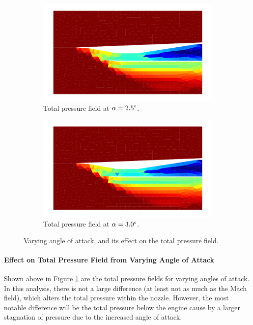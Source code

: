 \begin{figure}[h]
    \begin{subfigure}[h]{0.48\linewidth}
        \centering
        \includegraphics[width=\linewidth]{rep/q5/pt_a25.pdf}
        \caption{Total pressure field at $\alpha=2.5\degree$.}
    \end{subfigure}
    \begin{subfigure}[h]{0.48\linewidth}
        \centering
        \includegraphics[width=\linewidth]{rep/q5/pt_a30.pdf}
        \caption{Total pressure field at $\alpha=3.0\degree$.}
    \end{subfigure}
    \caption[Total Pressure Field with Varying Angle of Attack]{Varying angle of attack, and its effect on the total pressure field.}
    \label{fig:pt_fields}
\end{figure}

\paragraph{Effect on Total Pressure Field from Varying Angle of Attack} Shown above in Figure \ref{fig:pt_fields} are the total pressure fields for varying angles of attack. In this analysis, there is not a large difference (at least not as much as the Mach field), which alters the total pressure within the nozzle. However, the most notable difference will be the total pressure below the engine cause by a larger stagnation of pressure due to the increased angle of attack.


